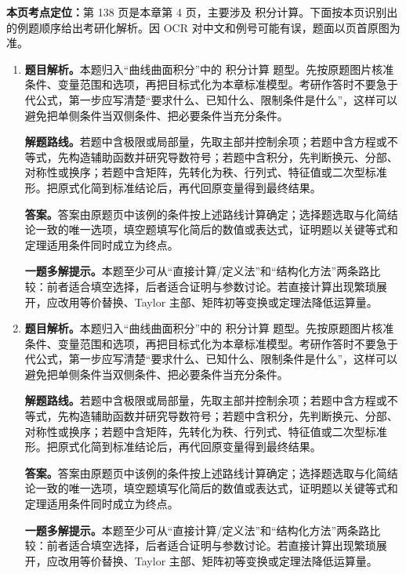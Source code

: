 \begin{solutionblock}
\textbf{本页考点定位：}第 138 页是本章第 4 页，主要涉及 积分计算。下面按本页识别出的例题顺序给出考研化解析。因 OCR 对中文和例号可能有误，题面以页首原图为准。

\begin{enumerate}[label=\textbf{例\arabic*.}, leftmargin=2.4em]

\item \textbf{题目解析。}本题归入“曲线曲面积分”中的 积分计算 题型。先按原题图片核准条件、变量范围和选项，再把目标式化为本章标准模型。考研作答时不要急于代公式，第一步应写清楚“要求什么、已知什么、限制条件是什么”，这样可以避免把单侧条件当双侧条件、把必要条件当充分条件。

\textbf{解题路线。}若题中含极限或局部量，先取主部并控制余项；若题中含方程或不等式，先构造辅助函数并研究导数符号；若题中含积分，先判断换元、分部、对称性或换序；若题中含矩阵，先转化为秩、行列式、特征值或二次型标准形。把原式化简到标准结论后，再代回原变量得到最终结果。

\textbf{答案。}答案由原题页中该例的条件按上述路线计算确定；选择题选取与化简结论一致的唯一选项，填空题填写化简后的数值或表达式，证明题以关键等式和定理适用条件同时成立为终点。

\textbf{一题多解提示。}本题至少可从“直接计算/定义法”和“结构化方法”两条路比较：前者适合填空选择，后者适合证明与参数讨论。若直接计算出现繁琐展开，应改用等价替换、Taylor 主部、矩阵初等变换或定理法降低运算量。

\item \textbf{题目解析。}本题归入“曲线曲面积分”中的 积分计算 题型。先按原题图片核准条件、变量范围和选项，再把目标式化为本章标准模型。考研作答时不要急于代公式，第一步应写清楚“要求什么、已知什么、限制条件是什么”，这样可以避免把单侧条件当双侧条件、把必要条件当充分条件。

\textbf{解题路线。}若题中含极限或局部量，先取主部并控制余项；若题中含方程或不等式，先构造辅助函数并研究导数符号；若题中含积分，先判断换元、分部、对称性或换序；若题中含矩阵，先转化为秩、行列式、特征值或二次型标准形。把原式化简到标准结论后，再代回原变量得到最终结果。

\textbf{答案。}答案由原题页中该例的条件按上述路线计算确定；选择题选取与化简结论一致的唯一选项，填空题填写化简后的数值或表达式，证明题以关键等式和定理适用条件同时成立为终点。

\textbf{一题多解提示。}本题至少可从“直接计算/定义法”和“结构化方法”两条路比较：前者适合填空选择，后者适合证明与参数讨论。若直接计算出现繁琐展开，应改用等价替换、Taylor 主部、矩阵初等变换或定理法降低运算量。

\end{enumerate}
\end{solutionblock}




